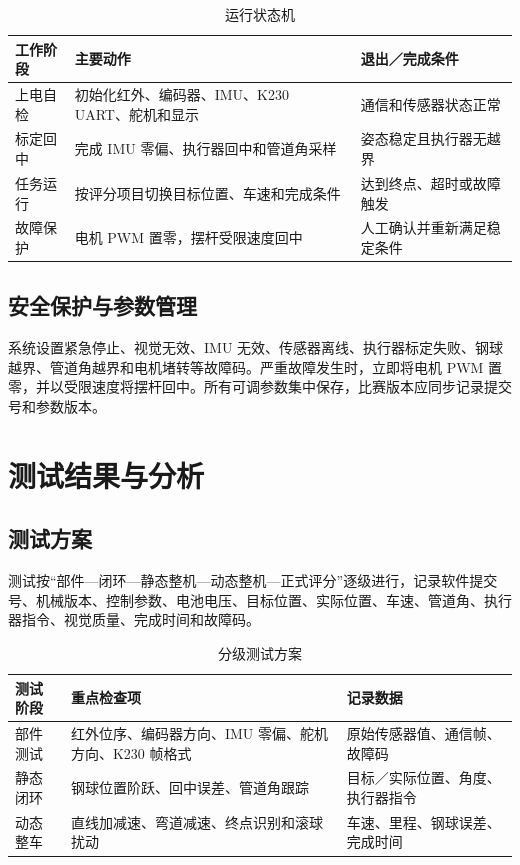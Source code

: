 \documentclass[UTF8,a4paper,12pt]{ctexart}
\begin{document}
\begin{table}[H]
  \centering
  \caption{运行状态机}
  \label{tab:state-machine}
  \begin{tabularx}{\textwidth}{>{\raggedright\arraybackslash}p{}>{\raggedright\arraybackslash}X>{\raggedright\arraybackslash}p{}}
    \toprule
    工作阶段 & 主要动作 & 退出／完成条件 \\
    \midrule
    上电自检 & 初始化红外、编码器、IMU、K230 UART、舵机和显示 & 通信和传感器状态正常 \\
    标定回中 & 完成 IMU 零偏、执行器回中和管道角采样 & 姿态稳定且执行器无越界 \\
    任务运行 & 按评分项目切换目标位置、车速和完成条件 & 达到终点、超时或故障触发 \\
    故障保护 & 电机 PWM 置零，摆杆受限速度回中 & 人工确认并重新满足稳定条件 \\
    \bottomrule
  \end{tabularx}
\end{table}

\subsection{安全保护与参数管理}

系统设置紧急停止、视觉无效、IMU 无效、传感器离线、执行器标定失败、钢球越界、管道角越界和电机堵转等故障码。严重故障发生时，立即将电机 PWM 置零，并以受限速度将摆杆回中。所有可调参数集中保存，比赛版本应同步记录提交号和参数版本。

\section{测试结果与分析}

\subsection{测试方案}

测试按“部件—闭环—静态整机—动态整机—正式评分”逐级进行，记录软件提交号、机械版本、控制参数、电池电压、目标位置、实际位置、车速、管道角、执行器指令、视觉质量、完成时间和故障码。

\begin{table}[H]
  \centering
  \caption{分级测试方案}
  \label{tab:test-plan}
  \begin{tabularx}{\textwidth}{>{\raggedright\arraybackslash}p{}>{\raggedright\arraybackslash}X>{\raggedright\arraybackslash}p{}}
    \toprule
    测试阶段 & 重点检查项 & 记录数据 \\
    \midrule
    部件测试 & 红外位序、编码器方向、IMU 零偏、舵机方向、K230 帧格式 & 原始传感器值、通信帧、故障码 \\
    静态闭环 & 钢球位置阶跃、回中误差、管道角跟踪 & 目标／实际位置、角度、执行器指令 \\
    动态整车 & 直线加减速、弯道减速、终点识别和滚球扰动 & 车速、里程、钢球误差、完成时间 \\
    \bottomrule
  \end{tabularx}
\end{table}
\end{document}
